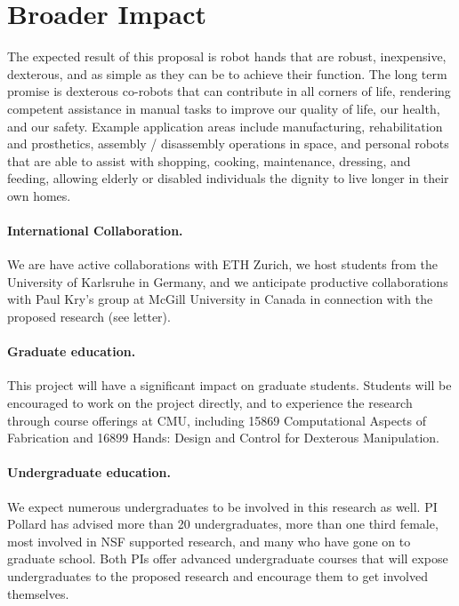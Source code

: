 
\section{Broader Impact}

The expected result of this proposal is robot hands that are robust, inexpensive, dexterous, and as simple as they can be to achieve their function.     The long term promise is dexterous co-robots that can contribute in all corners of life, rendering competent assistance in manual tasks to improve our quality of life, our health, and our safety.    Example application areas include manufacturing, rehabilitation and prosthetics, assembly / disassembly operations in space, and personal robots that are able to assist with shopping, cooking, maintenance, dressing, and feeding, allowing elderly or disabled individuals the dignity to live longer in their own homes.

\paragraph{International Collaboration.}
We are have active collaborations with ETH Zurich, we host students from the University of Karlsruhe in Germany, and we anticipate productive collaborations with Paul Kry's group at McGill University in Canada in connection with the proposed research (see letter).    

 \paragraph{Graduate education.} This project will have a significant impact on graduate students.   Students will be encouraged to work on the project directly, and to experience the research through course offerings at CMU, including 
 15869 Computational Aspects of Fabrication and 16899 Hands: Design and Control for Dexterous Manipulation.  

 \paragraph{Undergraduate education.}   We expect numerous undergraduates to be involved in this research as well.    PI Pollard has advised more than 20 undergraduates, more than one third female, most involved in NSF supported research, and many who have gone on to graduate school.    Both PIs offer advanced undergraduate courses that will expose undergraduates to the proposed research and encourage them to get involved themselves.

